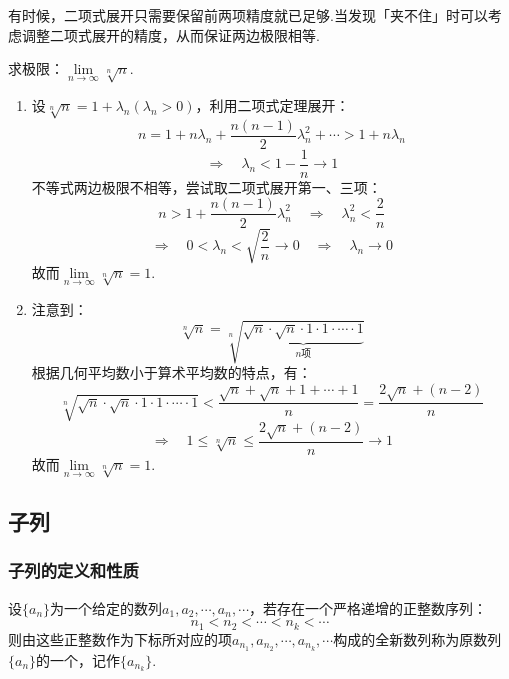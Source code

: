 有时候，二项式展开只需要保留前两项精度就已足够.当发现「夹不住」时可以考虑调整二项式展开的精度，从而保证两边极限相等.
\begin{question}
    求极限：$\lim\limits_{n \to \infty}\sqrt[n]{n}$.
\end{question}
\begin{solution}
    \begin{enumerate}[solution]
        \item 设$\sqrt[n]{n} = 1+\lambda_n(\lambda_n>0)$，利用二项式定理展开：
        \[n = 1 + n \lambda_n + \frac{n(n-1)}{2}\lambda_n^2+\cdots > 1 + n \lambda_n\]
        \[\Rightarrow\quad \lambda_n < 1-\frac{1}{n} \to 1\]
        不等式两边极限不相等，尝试取二项式展开第一、三项：
        \[n > 1 + \frac{n(n-1)}{2}\lambda_n^2 \quad\Rightarrow\quad \lambda_n^2 < \frac{2}{n}\]
        \[\Rightarrow\quad 0 < \lambda_n < \sqrt{\frac{2}{n}} \to 0 \quad\Rightarrow\quad \lambda_n \to 0\]
        故而$\lim\limits_{n \to \infty}\sqrt[n]{n} = 1$.

        \item 注意到：
        \[\sqrt[n]{n} = \sqrt[n]{\underbrace{\sqrt{n} \cdot \sqrt{n} \cdot 1 \cdot 1 \cdot \cdots \cdot 1}_\text{$n$项}}\]
        根据几何平均数小于算术平均数的特点，有：
        \[\sqrt[n]{\sqrt{n} \cdot \sqrt{n} \cdot 1 \cdot 1 \cdot \cdots \cdot 1} < \frac{\sqrt{n} + \sqrt{n} + 1 + \cdots + 1}{n} = \frac{2\sqrt{n}+(n-2)}{n}\]
        \[\Rightarrow\quad 1 \leqslant \sqrt[n]{n} \leqslant \frac{2\sqrt{n}+(n-2)}{n} \to 1\]
        故而$\lim\limits_{n \to \infty}\sqrt[n]{n} = 1$.
    \end{enumerate}
\end{solution}


\subsection{子列}
\subsubsection{子列的定义和性质}
\begin{definition}
    设$\{a_n\}$为一个给定的数列$a_1, a_2, \cdots, a_n, \cdots$，若存在一个严格递增的正整数序列：
    \[n_1 < n_2 < \cdots < n_k < \cdots\]
    则由这些正整数作为下标所对应的项$a_{n_1}, a_{n_2}, \cdots, a_{n_k}, \cdots$构成的全新数列称为原数列$\{a_n\}$的一个，记作$\{a_{n_k}\}$.
\end{definition}

